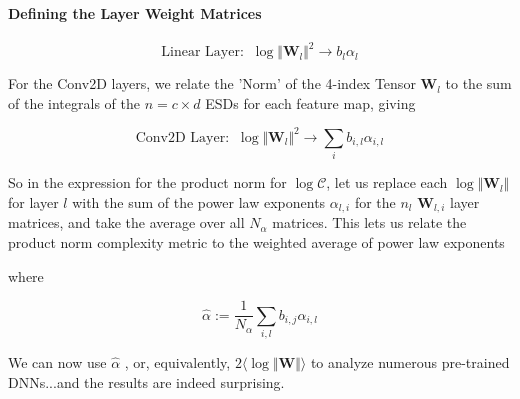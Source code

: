 


\paragraph{Defining the Layer Weight Matrices}

$$\text{Linear Layer:}\;\;\log\Vert\mathbf{W}_{l}\Vert^{2}\rightarrow b_{l}\alpha_{l}$$

For the Conv2D layers, we relate the 'Norm' of the 4-index Tensor $\mathbf{W}_{l}$ to the sum of the integrals of the $n=c\times d$ ESDs for each feature map, giving 

$$\text{Conv2D Layer:}\;\;\log\Vert\mathbf{W}_{l}\Vert^{2}\rightarrow \sum_{i}b_{i,l}\alpha_{i,l}$$

So in the expression for the product norm for $\log\mathcal{C}$, let us replace each $\log\Vert\mathbf{W}_{l}\Vert$ for layer $l$ with the sum of the power law exponents $\alpha_{l,i}$ for the $n{_l}$ $\mathbf{W}_{l,i}$ layer matrices, and take the average over all $N_{\alpha}$  matrices.  This lets us relate the product norm complexity metric to the weighted average of power law exponents

where

$$\hat{\alpha}:=\dfrac{1}{N_{\alpha}}\sum_{i,l}b_{i,j}\alpha_{i,l}$$


We can now use $\hat{\alpha}$ ,  or, equivalently, $2\langle\log\Vert\mathbf{W}\Vert\rangle$ to analyze numerous pre-trained DNNs...and the results are indeed surprising.


